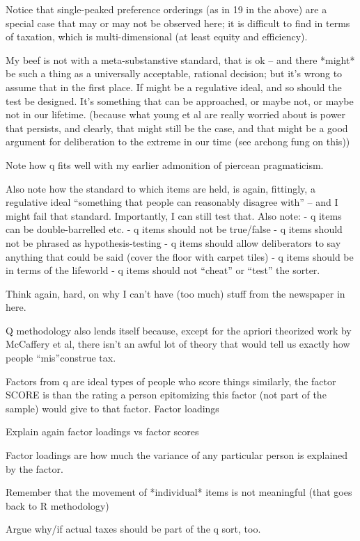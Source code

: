 Notice that single-peaked preference orderings (as in 19 in the above) are a special case that may or may not be observed here; it is difficult to find in terms of taxation, which is multi-dimensional (at least equity and efficiency).

My beef is not with a meta-substanstive standard, that is ok – and there *might* be such a thing as a universally acceptable, rational decision; but it's wrong to assume that in the first place. If might be a regulative ideal, and so should the test be designed. It's something that can be approached, or maybe not, or maybe not in our lifetime. (because what young et al are really worried about is power that persists, and clearly, that might still be the case, and that might be a good argument for deliberation to the extreme in our time (see archong fung on this))

Note how q fits well with my earlier admonition of piercean pragmaticism.

Also note how the standard to which items are held, is again, fittingly, a regulative ideal ``something that people can reasonably disagree with'' – and I might fail that standard.
Importantly, I can still test that.
Also note:
- q items can be double-barrelled etc.
- q items should not be true/false
- q items should not be phrased as hypothesis-testing
- q items should allow deliberators to say anything that could be said (cover the floor with carpet tiles)
- q items should be in terms of the lifeworld
- q items should not ``cheat'' or ``test'' the sorter.

Think again, hard, on why I can't have (too much) stuff from the newspaper in here.

Q methodology also lends itself because, except for the apriori theorized work by McCaffery et al, there isn't an awful lot of theory that would tell us exactly how people ``mis''construe tax.

Factors from q are ideal types of people who score things similarly, the factor SCORE is than the rating a person epitomizing this factor (not part of the sample) would give to that factor.
Factor loadings

Explain again factor loadings vs factor scores

Factor loadings are how much the variance of any particular person is explained by the factor.

Remember that the movement of *individual* items is not meaningful (that goes back to R methodology)

Argue why/if actual taxes should be part of the q sort, too.


